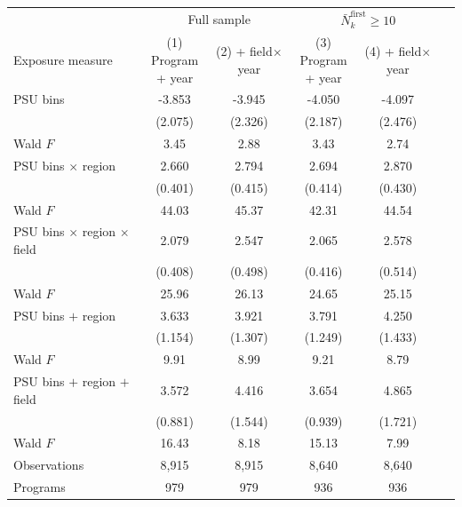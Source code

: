 \begin{tabular}{lccccc}
\toprule
 & \multicolumn{2}{c}{Full sample} & \multicolumn{2}{c}{\(\bar N^{\mathrm{first}}_{k}\geq10\)} \\
\cmidrule(lr){2-3}\cmidrule(lr){4-5}
Exposure measure & \shortstack{(1)\\Program\\+ year} & \shortstack{(2)\\+ field\(\times\)year} & \shortstack{(3)\\Program\\+ year} & \shortstack{(4)\\+ field\(\times\)year} \\
\midrule
PSU bins & -3.853\sym{*} & -3.945\sym{*} & -4.050\sym{*} & -4.097\sym{*} \\
 & (2.075) & (2.326) & (2.187) & (2.476) \\
\quad Wald \(F\) &  3.45 &  2.88 &  3.43 &  2.74 \\
\addlinespace
PSU bins \(\times\) region &  2.660\sym{***} &  2.794\sym{***} &  2.694\sym{***} &  2.870\sym{***} \\
 & (0.401) & (0.415) & (0.414) & (0.430) \\
\quad Wald \(F\) & 44.03 & 45.37 & 42.31 & 44.54 \\
PSU bins \(\times\) region \(\times\) field &  2.079\sym{***} &  2.547\sym{***} &  2.065\sym{***} &  2.578\sym{***} \\
 & (0.408) & (0.498) & (0.416) & (0.514) \\
\quad Wald \(F\) & 25.96 & 26.13 & 24.65 & 25.15 \\
\addlinespace
PSU bins \(+\) region &  3.633\sym{***} &  3.921\sym{***} &  3.791\sym{***} &  4.250\sym{***} \\
 & (1.154) & (1.307) & (1.249) & (1.433) \\
\quad Wald \(F\) &  9.91 &  8.99 &  9.21 &  8.79 \\
PSU bins \(+\) region \(+\) field &  3.572\sym{***} &  4.416\sym{***} &  3.654\sym{***} &  4.865\sym{***} \\
 & (0.881) & (1.544) & (0.939) & (1.721) \\
\quad Wald \(F\) & 16.43 &  8.18 & 15.13 &  7.99 \\
\midrule
Observations &     8,915 &     8,915 &     8,640 &     8,640 \\
Programs &       979 &       979 &       936 &       936 \\
\bottomrule
\end{tabular}
